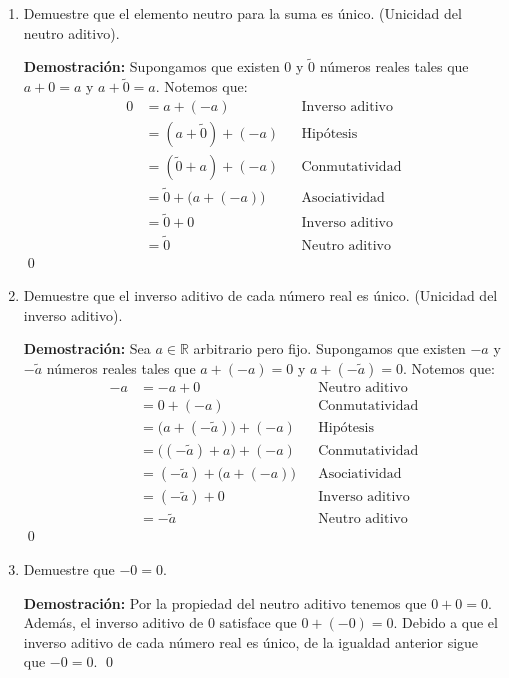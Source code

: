 \documentclass[11pt]{article}
\newcommand{\R}{\mathbb{R}}
\begin{document}
\begin{enumerate}[label=\alph*)]
    \item Demuestre que el elemento neutro para la suma es único. (Unicidad del neutro aditivo).
    
\textbf{Demostración:} 
Supongamos que existen 0 y $\tilde{0}$ números reales tales que $a+0 = a$ y $a+\tilde{0} = a$. Notemos que: \begin{align*}
    0 &=a+(-a) && \text{Inverso aditivo}\\
    &=\left( a+\tilde{0} \right)+\left(-a\right) && \text{Hipótesis}\\
    &=\left( \tilde{0}+a \right)+\left(-a\right) && \text{Conmutatividad}\\
    &=\tilde{0} + \bigl( a + \left(-a \right)\bigr) && \text{Asociatividad}\\
    &=\tilde{0} + 0 && \text{Inverso aditivo}\\
    &=\tilde{0} && \text{Neutro aditivo}
    \end{align*}\qed

    \item Demuestre que el inverso aditivo de cada número real es único. (Unicidad del inverso aditivo).
    
    \textbf{Demostración:}
    Sea $a\in \R$ arbitrario pero fijo. Supongamos que existen $-a$ y $-\tilde{a}$ números reales tales que $a + \left(-a\right) = 0$ y $a + \left(- \tilde{a}\right) = 0$. Notemos que:
    \begin{align*}
    -a &= -a+0 && \text{Neutro aditivo}\\
    &= 0+\left(-a\right) && \text{Conmutatividad}\\
    &= \bigl(a+\left(-\tilde{a} \right)\bigr)+\left(-a\right) && \text{Hipótesis}\\
    &= \bigl(\left(-\tilde{a} \right)+a\bigr)+\left(-a\right) && \text{Conmutatividad}\\
    &= \left(-\tilde{a} \right)+\bigl(a+\left(-a\right)\bigr) && \text{Asociatividad}\\
    &= \left(-\tilde{a} \right)+0 && \text{Inverso aditivo}\\
    &= -\tilde{a} && \text{Neutro aditivo}
    \end{align*} \qed

    \item Demuestre que $-0 = 0$.
    
    \textbf{Demostración:}
    Por la propiedad del neutro aditivo tenemos que $0+0=0$. Además, el inverso aditivo de $0$ satisface que $0 + (-0) = 0$. Debido a que el inverso aditivo de cada número real es único, de la igualdad anterior sigue que $-0 = 0$. \qed


\end{enumerate}
\end{document}
